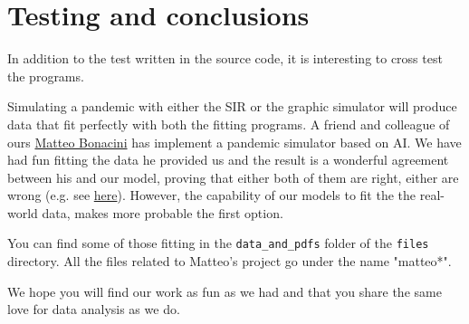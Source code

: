 \section{Testing and conclusions}

In addition to the test written in the source code, it is interesting to cross test the programs.

Simulating a pandemic with either the SIR or the graphic simulator will produce data that fit perfectly with both the fitting programs. A friend and colleague of ours \href{https://github.com/P2-718na/pandemic-simulation}{Matteo Bonacini} has implement a pandemic simulator based on AI. We have had fun fitting the data he provided us and the result is a wonderful agreement between his and our model, proving that either both of them are right, either are wrong (e.g. see \href{https://github.com/KaldarrostaJazz/pandemic_models/blob/main/logistic_model_forecasts/sati.md}{here}). However, the capability of our models to fit the the real-world data, makes more probable the first option. 

You can find some of those fitting in the \verb!data_and_pdfs! folder of the \verb!files! directory. All the files related to Matteo's project go under the name "matteo*".

We hope you will find our work as fun as we had and that you share the same love for data analysis as we do.